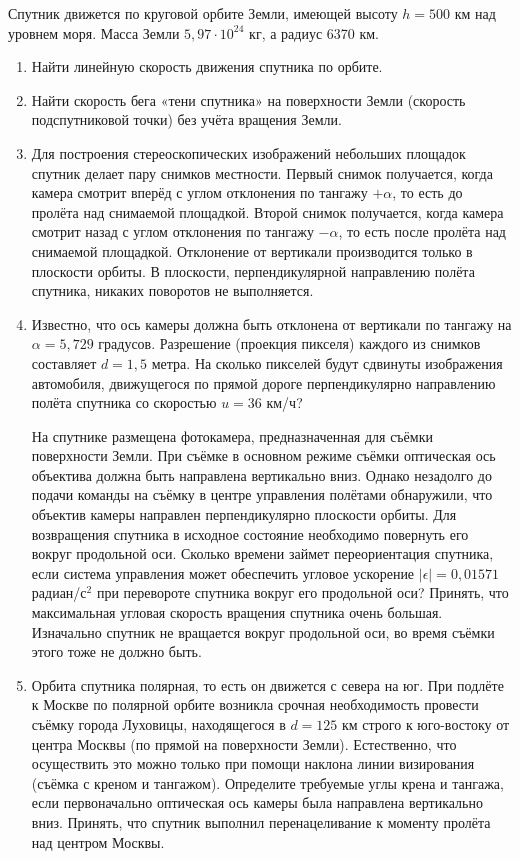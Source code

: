 
Спутник движется по круговой орбите Земли, имеющей высоту $h=500$ км над уровнем моря. Масса Земли $5,97 \cdot 10^{24}$ кг,
а радиус 6370 км.

\begin{enumerate}
    \item Найти линейную скорость движения спутника по орбите.
    \item Найти скорость бега «тени спутника» на поверхности Земли (скорость подспутниковой точки) без учёта 
    вращения Земли.
    \item Для построения стереоскопических изображений небольших площадок спутник делает пару снимков местности. 
    Первый снимок получается, когда камера смотрит вперёд с углом отклонения по тангажу $+\alpha$, то есть до пролёта 
    над снимаемой площадкой. Второй снимок получается, когда камера смотрит назад с углом отклонения по тангажу 
    $-\alpha$, то есть  после пролёта над снимаемой площадкой. Отклонение от вертикали производится только в 
    плоскости орбиты. В плоскости, перпендикулярной направлению полёта спутника, никаких поворотов не выполняется.
    \item Известно, что ось камеры должна быть отклонена от вертикали по тангажу на $\alpha=5,729$ градусов. 
    Разрешение (проекция пикселя) каждого из снимков составляет $d=1,5$ метра. На сколько пикселей будут сдвинуты 
    изображения автомобиля, движущегося по прямой дороге перпендикулярно направлению полёта спутника со скоростью 
    $u=36$ км/ч?

    На спутнике размещена фотокамера, предназначенная для съёмки поверхности Земли. При съёмке в основном режиме 
    съёмки оптическая ось объектива должна быть направлена вертикально вниз. Однако незадолго до подачи команды 
    на съёмку в центре управления полётами обнаружили, что объектив камеры направлен перпендикулярно плоскости 
    орбиты. Для возвращения спутника в исходное состояние необходимо повернуть его вокруг продольной оси. 
    Сколько времени займет переориентация спутника, если система управления может обеспечить угловое ускорение 
    $|\epsilon|=0,01571$ радиан/с$^2$ при перевороте спутника вокруг его продольной оси? Принять, что максимальная 
    угловая скорость вращения спутника очень большая. Изначально спутник не вращается вокруг продольной оси, 
    во время съёмки этого тоже не должно быть.
    \item Орбита спутника полярная, то есть он движется с севера на юг. При подлёте к Москве по полярной 
    орбите возникла срочная необходимость провести съёмку города Луховицы, находящегося в $d=125$ км строго к 
    юго-востоку от центра Москвы (по прямой на поверхности Земли). Естественно, что осуществить это можно только 
    при помощи наклона линии визирования (съёмка с креном и тангажом). Определите требуемые углы крена и тангажа, 
    если первоначально оптическая ось камеры была направлена вертикально вниз. Принять, что спутник выполнил 
    перенацеливание к моменту пролёта над центром Москвы.


\end{enumerate}
